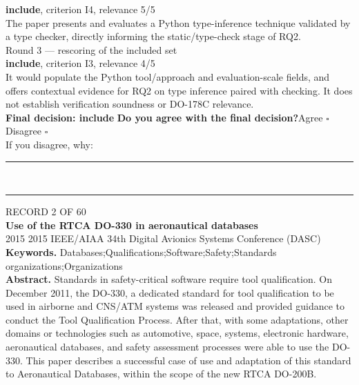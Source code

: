 \documentclass[11pt,a4paper]{article}
\begin{document}
{\small\textbf{include}, criterion I4, relevance 5/5}\\[0.5mm]
{\small The paper presents and evaluates a Python type-inference technique validated by a type checker, directly informing the static/type-check stage of RQ2.}\\[2.5mm]
{\footnotesize\color{soft}Round 3 --- rescoring of the included set}\\[0.5mm]
{\small\textbf{include}, criterion I3, relevance 4/5}\\[0.5mm]
{\small It would populate the Python tool/approach and evaluation-scale fields, and offers contextual evidence for RQ2 on type inference paired with checking. It does not establish verification soundness or DO-178C relevance.}\\[2.5mm]
{\small\textbf{Final decision: include}}
\vspace{2mm}
{\small\textbf{Do you agree with the final decision?}\quad{}Agree $\square$\qquad{}Disagree $\square$}\\[1mm]
{\footnotesize\color{soft}If you disagree, why:}\\[1mm]
\color{rule}\rule{\linewidth}{0.3pt}\\[3mm]\rule{\linewidth}{0.3pt}\color{black}
\clearpage
{\color{soft}\footnotesize RECORD 2 OF 60}\\[1mm]
{\large\bfseries Use of the RTCA DO-330 in aeronautical databases}\\[1.5mm]
{\color{soft}\small 2015 \textperiodcentered{} 2015 IEEE/AIAA 34th Digital Avionics Systems Conference (DASC)}\\[2mm]
{\small\textbf{Keywords.} Databases;Qualifications;Software;Safety;Standards organizations;Organizations}\\[2mm]
{\small\textbf{Abstract.} Standards in safety-critical software require tool qualification. On December 2011, the DO-330, a dedicated standard for tool qualification to be used in airborne and CNS/ATM systems was released and provided guidance to conduct the Tool Qualification Process. After that, with some adaptations, other domains or technologies such as automotive, space, systems, electronic hardware, aeronautical databases, and safety assessment processes were able to use the DO-330. This paper describes a successful case of use and adaptation of this standard to Aeronautical Databases, within the scope of the new RTCA DO-200B.}
\vspace{3mm}
\vspace{2.5mm}
\end{document}

